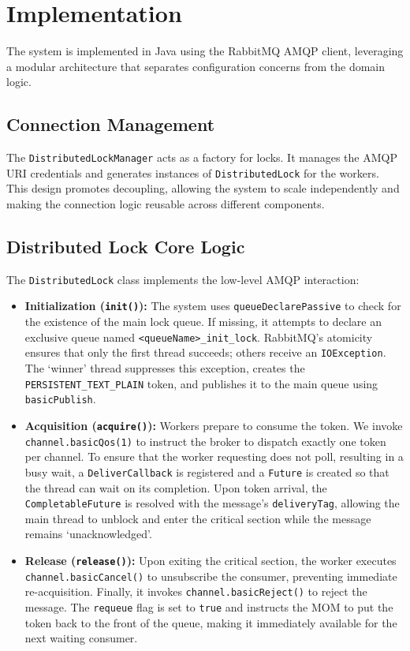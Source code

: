 \documentclass{scrartcl}
\begin{document}
    \section{Implementation}
    The system is implemented in Java using the RabbitMQ AMQP client, leveraging a modular architecture that separates configuration concerns from the domain logic.

    \subsection*{Connection Management}
    The \texttt{DistributedLockManager} acts as a factory for locks. It manages the AMQP URI credentials and generates instances of \texttt{DistributedLock} for the workers. This design promotes decoupling, allowing the system to scale independently and making the connection logic reusable across different components.

    \subsection*{Distributed Lock Core Logic}
    The \texttt{DistributedLock} class implements the low-level AMQP interaction:

    \begin{itemize}
        \item \textbf{Initialization (\texttt{init()}):} The system uses \texttt{queueDeclarePassive} to check for the existence of the main lock queue. If missing, it attempts to declare an exclusive queue named \texttt{<queueName>\_init\_lock}. RabbitMQ's atomicity ensures that only the first thread succeeds; others receive an \texttt{IOException}. The `winner' thread suppresses this exception, creates the \texttt{PERSISTENT\_TEXT\_PLAIN} token, and publishes it to the main queue using \texttt{basicPublish}. %

        \item \textbf{Acquisition (\texttt{acquire()}):} Workers prepare to consume the token. We invoke \texttt{channel.basicQos(1)} to instruct the broker to dispatch exactly one token per channel. %
        To ensure that the worker requesting does not poll, resulting in a busy wait, a \texttt{DeliverCallback} is registered and a \texttt{Future} is created so that the thread can wait on its completion.
        Upon token arrival, the \texttt{CompletableFuture} is resolved with the message's \texttt{deliveryTag}, allowing the main thread to unblock and enter the critical section while the message remains `unacknowledged'.

        \item \textbf{Release (\texttt{release()}):} Upon exiting the critical section, the worker executes \texttt{channel.\-basicCancel()} to unsubscribe the consumer, preventing immediate re-acquisition. Finally, it invokes \texttt{channel.\-basicReject()} to reject the message. The \texttt{requeue} flag is set to \texttt{true} and instructs the MOM to put the token back to the front of the queue, making it immediately available for the next waiting consumer.%
    \end{itemize}
\end{document}
